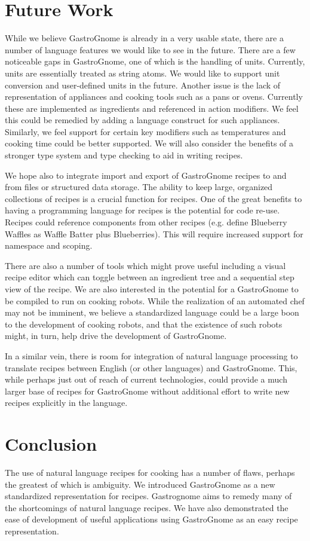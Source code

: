 \documentclass[pldi]{sigplanconf-pldi15}
\begin{document}
\section{Future Work}
While we believe GastroGnome is already in a very usable state, there are a
number of language features we would like to see in the future. There are a
few noticeable gaps in GastroGnome, one of which is the handling of units.
Currently, units are essentially treated as string atoms. We would like to
support unit conversion and user-defined units in the future. Another issue is
the lack of representation of appliances and cooking tools such as a pans or
ovens. Currently these are implemented as ingredients and referenced in action
modifiers. We feel this could be remedied by adding a language construct for
such appliances. Similarly, we feel support for certain key modifiers such as
temperatures and cooking time could be better supported. We will also consider
the benefits of a stronger type system and type checking to aid in writing
recipes.

We hope also to integrate import and export of GastroGnome recipes to and from
files or structured data storage. The ability to keep large, organized
collections of recipes is a crucial function for recipes. One of the great
benefits to having a programming language for recipes is the potential for
code re-use. Recipes could reference components from other recipes (e.g.
define Blueberry Waffles as Waffle Batter plus Blueberries). This will require
increased support for namespace and scoping.

There are also a number of tools which might prove useful including a visual
recipe editor which can toggle between an ingredient tree and a sequential
step view of the recipe. We are also interested in the potential for a
GastroGnome to be compiled to run on cooking robots. While the realization of
an automated chef may not be imminent, we believe a standardized language
could be a large boon to the development of cooking robots, and that the
existence of such robots might, in turn, help drive the development of
GastroGnome.

In a similar vein, there is room for integration of natural language
processing to translate recipes between English (or other languages) and
GastroGnome. This, while perhaps just out of reach of current technologies,
could provide a much larger base of recipes for GastroGnome without additional
effort to write new recipes explicitly in the language.


\section{Conclusion}
The use of natural language recipes for cooking has a number of flaws, perhaps
the greatest of which is ambiguity. We introduced GastroGnome as a new
standardized representation for recipes. Gastrognome aims to remedy many of
the shortcomings of natural language recipes. We have also demonstrated the
ease of development of useful applications using GastroGnome as an easy recipe
representation.
\end{document}
